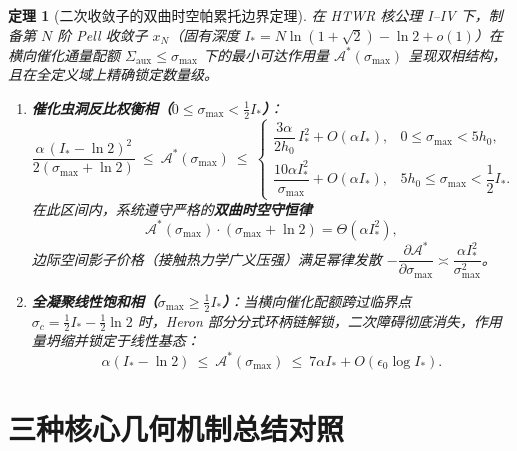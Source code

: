 \documentclass[11pt,a4paper]{ctexart}
\theoremstyle{plain}
\newtheorem{theorem}{定理}[section]
\theoremstyle{definition}
\newcommand{\cA}{\mathcal{A}}
\newcommand{\Saux}{\Sigma_{\mathrm{aux}}}
\begin{document}
\begin{theorem}[二次收敛子的双曲时空帕累托边界定理]\label{thm:pareto}
在 HTWR 核公理 I--IV 下，制备第 $N$ 阶 Pell 收敛子 $x_N$（固有深度 $I_* = N \ln(1+\sqrt{2}) - \ln 2 + o(1)$）在横向催化通量配额 $\Saux \le \sigma_{\max}$ 下的最小可达作用量 $\cA^*(\sigma_{\max})$ 呈现双相结构，且在全定义域上精确锁定数量级。

\begin{enumerate}
\item \textbf{催化虫洞反比权衡相（$0 \le \sigma_{\max} < \frac{1}{2} I_*$）}：
\[
\frac{\alpha\,(I_* - \ln 2)^2}{2(\sigma_{\max} + \ln 2)}
\ \le\ \cA^*(\sigma_{\max})
\ \le\
\begin{cases}
\dfrac{3\alpha}{2 h_0}\, I_*^2 + O(\alpha I_*), & 0 \le \sigma_{\max} < 5 h_0, \\[10pt]
\dfrac{10\alpha I_*^2}{\sigma_{\max}} + O(\alpha I_*), & 5 h_0 \le \sigma_{\max} < \dfrac{1}{2} I_* .
\end{cases}
\]
在此区间内，系统遵守严格的\textbf{双曲时空守恒律}
\[
\cA^*(\sigma_{\max}) \cdot (\sigma_{\max} + \ln 2) = \Theta(\alpha I_*^2),
\]
边际空间影子价格（接触热力学广义压强）满足幂律发散 $-\dfrac{\partial \cA^*}{\partial \sigma_{\max}} \asymp \dfrac{\alpha I_*^2}{\sigma_{\max}^2}$。

\item \textbf{全凝聚线性饱和相（$\sigma_{\max} \ge \frac{1}{2} I_*$）}：当横向催化配额跨过临界点 $\sigma_c = \frac{1}{2} I_* - \frac{1}{2}\ln 2$ 时，Heron 部分分式环柄链解锁，二次障碍彻底消失，作用量坍缩并锁定于线性基态：
\[
\alpha (I_* - \ln 2) \ \le\ \cA^*(\sigma_{\max}) \ \le\ 7\alpha I_* + O(\epsilon_0 \log I_*).
\]
\end{enumerate}
\end{theorem}

\clearpage
\section{三种核心几何机制总结对照}
\end{document}
